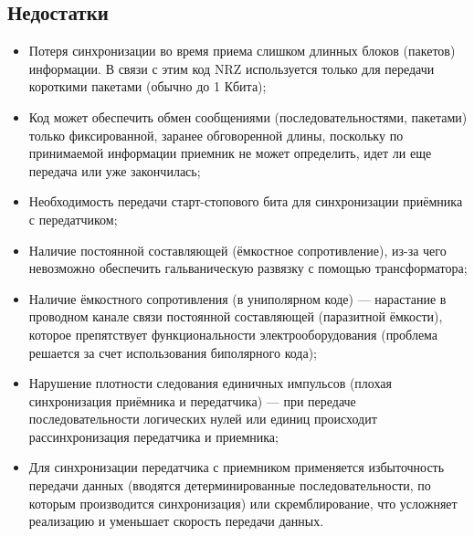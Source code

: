 \documentclass[a4paper14pt]{article}
\begin{document}
\subsection{Недостатки}
\begin{itemize}
    \item Потеря синхронизации во время приема слишком длинных блоков (пакетов) информации. В связи с этим код NRZ используется только для передачи короткими пакетами (обычно до 1 Кбита);
    \item Код может обеспечить обмен сообщениями (последовательностями, пакетами) только фиксированной, заранее обговоренной длины, поскольку по принимаемой информации приемник не может определить, идет ли еще передача или уже закончилась;
    \item Необходимость передачи старт-стопового бита для синхронизации приёмника с передатчиком;
    \item Наличие постоянной составляющей (ёмкостное сопротивление), из-за чего невозможно обеспечить гальваническую развязку с помощью трансформатора;
    \item Наличие ёмкостного сопротивления (в униполярном коде) — нарастание в проводном канале связи постоянной составляющей (паразитной ёмкости), которое препятствует функциональности электрооборудования (проблема решается за счет использования биполярного кода);
    \item Нарушение плотности следования единичных импульсов (плохая синхронизация приёмника и передатчика) — при передаче последовательности логических нулей или единиц происходит рассинхронизация передатчика и приемника;
    \item Для синхронизации передатчика с приемником применяется избыточность передачи данных (вводятся детерминированные последовательности, по которым производится синхронизация) или скремблирование, что усложняет реализацию и уменьшает скорость передачи данных.
\end{itemize}
\end{document}
